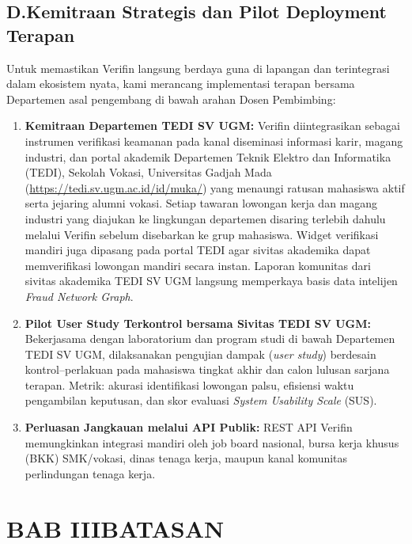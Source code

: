 \documentclass[12pt,a4paper]{article}
\begin{document}
\subsection*{D.\quad Kemitraan Strategis dan Pilot Deployment Terapan}

Untuk memastikan Verifin langsung berdaya guna di lapangan dan terintegrasi dalam ekosistem nyata, kami merancang implementasi terapan bersama Departemen asal pengembang di bawah arahan Dosen Pembimbing:

\begin{enumerate}[label=\textbf{\arabic*.}]
\item \textbf{Kemitraan Departemen TEDI SV UGM:} Verifin diintegrasikan sebagai instrumen verifikasi keamanan pada kanal diseminasi informasi karir, magang industri, dan portal akademik Departemen Teknik Elektro dan Informatika (TEDI), Sekolah Vokasi, Universitas Gadjah Mada (\url{https://tedi.sv.ugm.ac.id/id/muka/}) yang menaungi ratusan mahasiswa aktif serta jejaring alumni vokasi. Setiap tawaran lowongan kerja dan magang industri yang diajukan ke lingkungan departemen disaring terlebih dahulu melalui Verifin sebelum disebarkan ke grup mahasiswa. Widget verifikasi mandiri juga dipasang pada portal TEDI agar sivitas akademika dapat memverifikasi lowongan mandiri secara instan. Laporan komunitas dari sivitas akademika TEDI SV UGM langsung memperkaya basis data intelijen \textit{Fraud Network Graph}.

\item \textbf{Pilot User Study Terkontrol bersama Sivitas TEDI SV UGM:} Bekerjasama dengan laboratorium dan program studi di bawah Departemen TEDI SV UGM, dilaksanakan pengujian dampak (\textit{user study}) berdesain kontrol--perlakuan pada mahasiswa tingkat akhir dan calon lulusan sarjana terapan. Metrik: akurasi identifikasi lowongan palsu, efisiensi waktu pengambilan keputusan, dan skor evaluasi \textit{System Usability Scale} (SUS).

\item \textbf{Perluasan Jangkauan melalui API Publik:} REST API Verifin memungkinkan integrasi mandiri oleh job board nasional, bursa kerja khusus (BKK) SMK/vokasi, dinas tenaga kerja, maupun kanal komunitas perlindungan tenaga kerja.
\end{enumerate}


\section*{BAB III\quad BATASAN}
\end{document}
